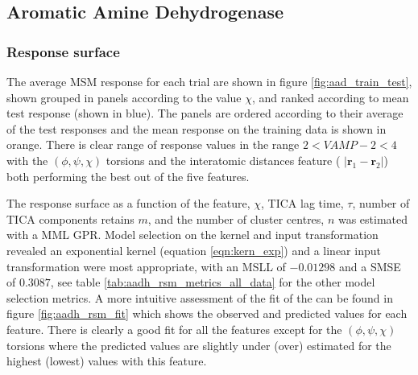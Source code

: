 
\subsection{Aromatic Amine Dehydrogenase}\label{subsec:aadh}
\subsubsection{Response surface}\label{subsubsec:aadh_rsm}
The average MSM response for each trial are shown in figure \ref{fig:aad_train_test}, shown grouped in panels according to the value $\chi$,  and ranked according to mean test response (shown in blue). The panels are ordered according to their average of the test responses and the mean response on the training data is shown in orange. There is clear range of response values in the range $2 < VAMP-2 < 4$ with the $(\phi, \psi, \chi)$ torsions and the interatomic distances feature ( $\left|\mathbf{r}_{1}-\mathbf{r}_{2}\right|$) both performing the best out of the five features. 

The response surface as a function of the feature, $\chi$, TICA lag time, $\tau$, number of TICA components retains $m$, and the number of cluster centres, $n$ was estimated with a MML GPR. Model selection on the kernel and input transformation revealed an exponential kernel (equation \ref{eqn:kern_exp}) and a linear input transformation were most appropriate, with an MSLL of $-0.01298$ and a SMSE of $0.3087$, see table \ref{tab:aadh_rsm_metrics_all_data} for the other model selection metrics. A more intuitive assessment of the fit of the can be found in figure  \ref{fig:aadh_rsm_fit} which shows the observed and predicted values for each feature. There is clearly a good fit for all the features except for the $(\phi, \psi, \chi)$ torsions where the predicted values are slightly under (over) estimated for the highest (lowest) values with this feature. 

